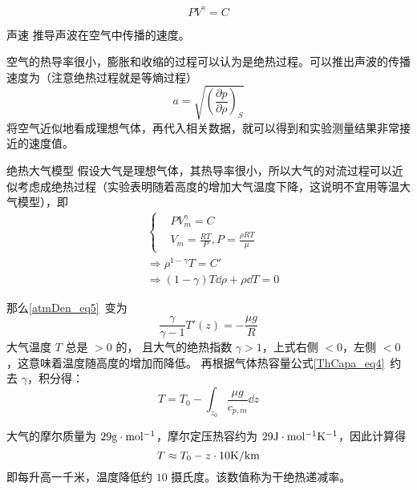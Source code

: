 \begin{equation}
P V^\gamma = C
\end{equation}

\begin{example}{声速}
推导声波在空气中传播的速度。

空气的热导率很小，膨胀和收缩的过程可以认为是绝热过程。可以推出声波的传播速度为（注意绝热过程就是等熵过程）
\begin{equation}
a=\sqrt{\left(\frac{\partial p}{\partial \rho}\right)_S}
\end{equation}
将空气近似地看成理想气体，再代入相关数据，就可以得到和实验测量结果非常接近的速度值。
\end{example}
\begin{example}{绝热大气模型}
假设大气是理想气体，其热导率很小，所以大气的对流过程可以近似考虑成绝热过程（实验表明随着高度的增加大气温度下降，这说明不宜用等温大气模型），即
\begin{equation}
\begin{aligned}
&\begin{cases}
&PV_m^\gamma=C\\
&V_m=\frac{RT}{P},P=\frac{\rho R T}{\mu}
\end{cases}
\\
&\Rightarrow \rho^{1-\gamma}T=C'\\
&\Rightarrow (1-\gamma)T\dd \rho+\rho\dd T=0  
\end{aligned}
\end{equation}

那么\autoref{atmDen_eq5}~变为
\begin{equation}
\frac{\gamma}{\gamma-1}T'(z)=-\frac{\mu g}{R}
\end{equation}
大气温度 $T$ 总是 $>0$ 的， 且大气的绝热指数 $\gamma>1$，上式右侧 $<0$，左侧 $<0$，这意味着温度随高度的增加而降低。 再根据气体热容量公式\autoref{ThCapa_eq4}~约去 $\gamma$，积分得：
\begin{equation}\label{Adiab_eq6}
T=T_0-\int_{z_0}\frac{\mu g}{c_{p,m}} \dd z 
\end{equation}

大气的摩尔质量为 $29 \rm{g\cdot mol^{-1}}$，摩尔定压热容约为 $29 \rm{J\cdot mol^{-1}K^{-1}}$，因此计算得
\begin{equation}
T\approx T_0-z\cdot 10 \rm{K/km}
\end{equation}
即每升高一千米，温度降低约 $10$ 摄氏度。该数值称为干绝热递减率。
\end{example}
